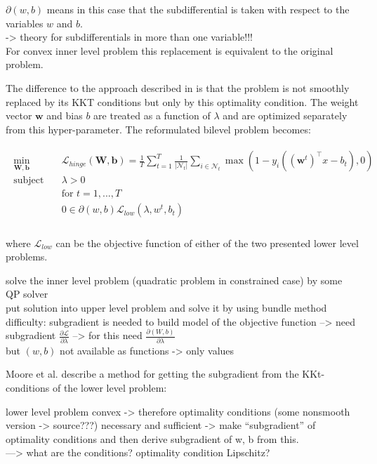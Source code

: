 \(\partial(w,b)\) means in this case that the subdifferential is taken with respect to the variables \(w\) and \(b\). \\
-> theory for subdifferentials in more than one variable!!! \\

For convex inner level problem this replacement is equivalent to the original problem.

The difference to the approach described in \cite{Kunapuli2008} is that the problem is not smoothly replaced by its KKT conditions but only by this optimality condition. The weight vector \(\bm{w}\) and bias \(b\) are treated as a function of \(\lambda\) and are optimized separately from this hyper-parameter.
The reformulated bilevel problem becomes:

\begin{align}
	\begin{split}
	\min_{\bm{W},\bm{b}} \quad &  \mathcal{L}_{hinge}(\bm{W},\bm{b}) = \frac{1}{T}\sum_{t=1}^T\frac{1}{|\mathcal{N}_t|}\sum_{i \in \mathcal{N}_t}{\max\left(1-y_i((\bm{w}^t)^{\top}x-b_t),0\right)}\\
	\text{subject to} \quad & \lambda > 0 \\
	& \text{for } t = 1,...,T \\
	& 0 \in \partial(w,b)\mathcal{L}_{low}(\lambda,w^t,b_t) \\
\end{split}
\label{SVM_opt_cond}
\end{align}

where \(\mathcal{L}_{low}\) can be the objective function of either of the two presented lower level problems.



solve the inner level problem (quadratic problem in constrained case) by some QP solver \\
put solution into upper level problem and solve it by using bundle method \\
difficulty: subgradient is needed to build model of the objective function --> need subgradient \(\frac{\partial \mathcal{L}}{\partial \lambda}\) --> for this need \(\frac{\partial (W,b)}{\partial \lambda}\) \\
but \((w,b)\) not available as functions -> only values

Moore et al. \cite{Moore2011} describe a method for getting the subgradient from the KKt-conditions of the lower level problem:

lower level problem convex -> therefore optimality conditions (some nonsmooth version -> source???) necessary and sufficient -> make ``subgradient'' of optimality conditions and then derive subgradient of w, b from this. \\
---> what are the conditions? optimality condition Lipschitz? 

